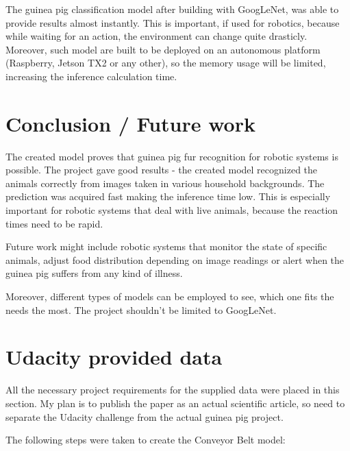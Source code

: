 \documentclass[10pt,journal,compsoc]{IEEEtran}
\begin{document}
    The guinea pig classification model after building with GoogLeNet, was able to provide results almost instantly. This is important, if used for robotics, because while waiting for an action, the environment can change quite drasticly. Moreover, such model are built to be deployed on an autonomous platform (Raspberry, Jetson TX2 or any other), so the memory usage will be limited, increasing the inference calculation time.
    
    \section{Conclusion / Future work}
    The created model proves that guinea pig fur recognition for robotic systems is possible. The project gave good results - the created model recognized the animals correctly from images taken in various household backgrounds. The prediction was acquired fast making the inference time low. This is especially important for robotic systems that deal with live animals, because the reaction times need to be rapid. 

    Future work might include robotic systems that monitor the state of specific animals, adjust food distribution depending on image readings or alert when the guinea pig suffers from any kind of illness.

    Moreover, different types of models can be employed to see, which one fits the needs the most. The project shouldn't be limited to GoogLeNet.
    
   
   

   \newpage
    \section{Udacity provided data}

    All the necessary project requirements for the supplied data were placed in this section. My plan is to publish the paper as an actual scientific article, so need to separate the Udacity challenge from the actual guinea pig project.\newline

    \noindent The following steps were taken to create the Conveyor Belt model:
\end{document}
